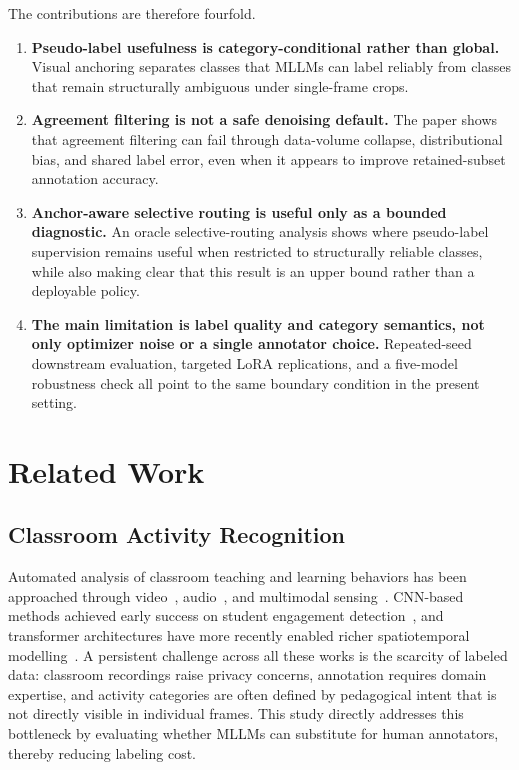 \documentclass[10pt,letterpaper]{article}
\begin{document}
The contributions are therefore fourfold.

\begin{enumerate}

  \item \textbf{Pseudo-label usefulness is category-conditional rather
  than global.}
  Visual anchoring separates classes that MLLMs can label reliably
  from classes that remain structurally ambiguous under single-frame
  crops.

  \item \textbf{Agreement filtering is not a safe denoising default.}
  The paper shows that agreement filtering can fail through
  data-volume collapse, distributional bias, and shared label error,
  even when it appears to improve retained-subset annotation accuracy.

  \item \textbf{Anchor-aware selective routing is useful only as a
  bounded diagnostic.}
  An oracle selective-routing analysis shows where pseudo-label
  supervision remains useful when restricted to structurally reliable
  classes, while also making clear that this result is an upper bound
  rather than a deployable policy.

  \item \textbf{The main limitation is label quality and category
  semantics, not only optimizer noise or a single annotator choice.}
  Repeated-seed downstream evaluation, targeted LoRA replications, and
  a five-model robustness check all point to the same boundary
  condition in the present setting.

\end{enumerate}


\section*{Related Work}
\label{sec:related}

\subsection*{Classroom Activity Recognition}

Automated analysis of classroom teaching and learning behaviors has
been approached through video~\cite{whitehill2014automated},
audio~\cite{donnelly2017automatic}, and multimodal
sensing~\cite{dillenbourg2011classroom}.
CNN-based methods achieved early success on student engagement
detection~\cite{zhang2020classroom_cnn}, and transformer architectures
have more recently enabled richer spatiotemporal
modelling~\cite{li2022classroom_transformer}.
A persistent challenge across all these works is the scarcity of
labeled data: classroom recordings raise privacy concerns, annotation
requires domain expertise, and activity categories are often defined
by pedagogical intent that is not directly visible in individual
frames.
This study directly addresses this bottleneck by evaluating whether
MLLMs can substitute for human annotators, thereby reducing labeling
cost.
\end{document}
